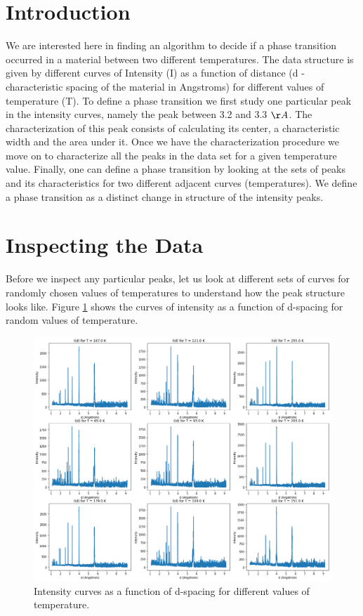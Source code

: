 

\section{Introduction} \label{Intro}
	We are interested here in finding an algorithm to decide if a phase transition occurred in a material between two different temperatures. The data structure is given by different curves of Intensity (I) as a function of distance (d - characteristic spacing of the material in Angstroms) for different values of temperature (T).
To define a phase transition we first study one particular peak in the intensity curves, namely the peak between 3.2 and 3.3 ${\AA}$. The characterization of this peak consists of calculating its center, a characteristic width and the area under it.
Once we have the characterization procedure we move on  to characterize all the peaks in the data set for a given temperature value. Finally, one can define a phase transition by looking at the sets of peaks and its characteristics for two different adjacent curves (temperatures). We define a phase transition as a distinct change in structure of the intensity peaks.

\section{Inspecting the Data} \label{Data}
	Before we inspect any particular peaks, let us look at different sets of curves for randomly chosen values of temperatures to understand how the peak structure looks like. Figure \ref{fig:randTs}  shows the curves of intensity as a function of d-spacing for random values of temperature.

\begin{figure}[h]
  \centering
  \includegraphics[scale=0.25]{../figs/randomTs.png}
  \caption{Intensity curves as a function of d-spacing for different values of temperature.}
  \label{fig:randTs}
\end{figure}

